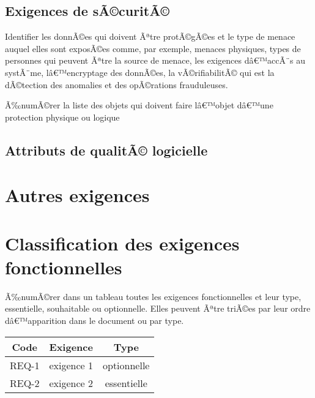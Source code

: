 \documentclass[a4paper, french, 10pt]{report}
\begin{document}
	\subsection{Exigences de sÃ©curitÃ©}
	Identifier les donnÃ©es qui doivent Ãªtre protÃ©gÃ©es et le type de menace auquel elles sont exposÃ©es comme, par exemple, menaces physiques, types de personnes qui peuvent Ãªtre la source de menace, les exigences dâ€™accÃ¨s au systÃ¨me, lâ€™encryptage des donnÃ©es, la vÃ©rifiabilitÃ© qui est la dÃ©tection des anomalies et des opÃ©rations frauduleuses. 

	Ã‰numÃ©rer la liste des objets qui doivent faire lâ€™objet dâ€™une protection physique ou logique

	\subsection{Attributs de qualitÃ© logicielle}
	

\section{Autres exigences}


\section{Classification des exigences fonctionnelles}

Ã‰numÃ©rer dans un tableau toutes les exigences fonctionnelles et leur type, essentielle, souhaitable ou optionnelle. Elles peuvent Ãªtre triÃ©es par leur ordre dâ€™apparition dans le document ou par type.

\begin{center}
\begin{tabular}{|c|c|c|}
\hline
Code & Exigence & Type\\
\hline
REQ-1 & exigence 1 & optionnelle\\
\hline
REQ-2 & exigence 2 & essentielle\\
\hline
\end{tabular}
\end{center}
\end{document}
